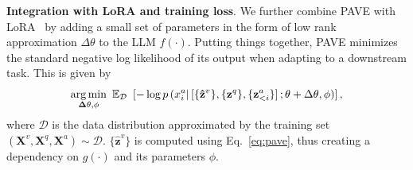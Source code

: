 \medskip
\noindent \textbf{Integration with LoRA and training loss}. We further combine PAVE with LoRA~\cite{hu2021loralowrankadaptationlarge} by adding a small set of parameters in the form of low rank approximation $\Delta \theta$ to the LLM $f(\cdot)$. Putting things together, PAVE minimizes the standard negative log likelihood of its output when adapting to a downstream task. This is given by 
\begin{equation*}
\operatorname*{arg\,min}_{\mathbf{\Delta\theta}, \mathbf{\phi}} \ \mathbb{E}_{\mathcal{D}} \ \left[ -\log p \left( x^a_i | \left[ \{\mathbf{\hat{z}}^{v}\}, \{\mathbf{z}^{q}\}, \{\mathbf{z}^a_{<i}\} \right]; \theta+\Delta \theta, \phi \right) \right],
\end{equation*}
where $\mathcal{D}$ is the data distribution approximated by the training set $(\mathbf{X}^v, \mathbf{X}^q, \mathbf{X}^a) \sim \mathcal{D}$. $\{\mathbf{\hat{z}}^{v}\}$ is computed using Eq.\ \ref{eq:pave}, thus creating a dependency on $g(\cdot)$ and its parameters $\phi$.




